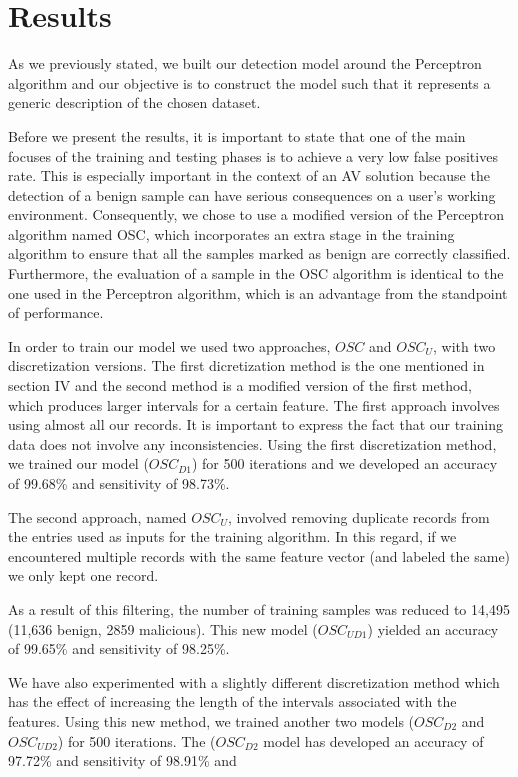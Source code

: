 \section{Results}
\par
As we previously stated, we built our detection model around the Perceptron algorithm and our objective is to construct the model such that it represents a generic description of the chosen dataset.
\par
Before we present the results, it is important to state that one of the main focuses of the training and testing phases is to achieve a very low false positives rate. This is especially important in the context of an AV solution because the detection of a benign sample can have serious consequences on a user's working environment. Consequently, we chose to use a modified version of the Perceptron algorithm named OSC, which incorporates an extra stage in the training algorithm to ensure that all the samples marked as benign are correctly classified. Furthermore, the evaluation of a sample in the OSC algorithm is identical to the one used in the Perceptron algorithm, which is an advantage from the standpoint of performance.
\par
In order to train our model we used two approaches, $OSC$ and $OSC_{U}$, with two discretization versions. The first dicretization method is the one mentioned in section IV and the second method is a modified version of the first method, which produces larger intervals for a certain feature. The first approach involves using almost all our records. It is important to express the fact that our training data does not involve any inconsistencies. Using the first discretization method, we trained our model ({$OSC_{D1}$}) for 500 iterations and we developed an accuracy of 99.68\% and sensitivity of 98.73\%. 
\par
The second approach, named $OSC_{U}$,  involved removing duplicate records from the entries used as inputs for the training algorithm. In this regard, if we encountered multiple records with the same feature vector (and labeled the same) we only kept one record.
\par
As a result of this filtering, the number of training samples was reduced to 14,495 (11,636 benign, 2859 malicious). This new model ({$OSC_{UD1}$}) yielded an accuracy of 99.65\% and sensitivity of 98.25\%.
\par
We have also experimented with a slightly different discretization method which has the effect of increasing the length of the intervals associated with the features. Using this new method, we trained another two models ({$OSC_{D2}$} and {$OSC_{UD2}$}) for 500 iterations. The ({$OSC_{D2}$} model has developed an accuracy of 97.72\% and sensitivity of 98.91\% and

